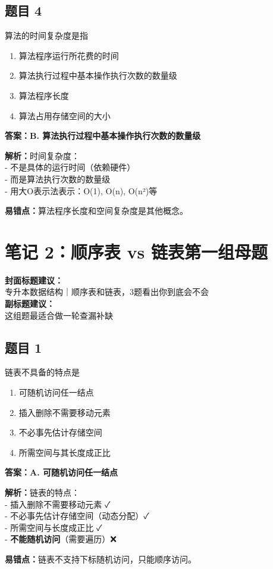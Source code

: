 \documentclass[12pt,a4paper]{ctexart}
\begin{document}
\subsection*{题目 4}
算法的时间复杂度是指
\begin{enumerate}[label=\Alph*.]
	\item 算法程序运行所花费的时间
	\item 算法执行过程中基本操作执行次数的数量级
	\item 算法程序长度
	\item 算法占用存储空间的大小
\end{enumerate}

\begin{answerbox}
	\textbf{答案：B. 算法执行过程中基本操作执行次数的数量级}

	\textbf{解析：}时间复杂度：\\
	- 不是具体的运行时间（依赖硬件）\\
	- 而是算法执行次数的数量级\\
	- 用大O表示法表示：O(1), O(n), O(n²)等

	\textbf{易错点：}算法程序长度和空间复杂度是其他概念。
\end{answerbox}

\newpage

\section{笔记 2：顺序表 vs 链表第一组母题}
\begin{coverbox}
	\textbf{封面标题建议：}\\
	专升本数据结构｜顺序表和链表，3题看出你到底会不会\\
	\textbf{副标题建议：}\\
	这组题最适合做一轮查漏补缺
\end{coverbox}

\subsection*{题目 1}
链表不具备的特点是
\begin{enumerate}[label=\Alph*.]
	\item 可随机访问任一结点
	\item 插入删除不需要移动元素
	\item 不必事先估计存储空间
	\item 所需空间与其长度成正比
\end{enumerate}

\begin{answerbox}
	\textbf{答案：A. 可随机访问任一结点}

	\textbf{解析：}链表的特点：\\
	- 插入删除不需要移动元素 ✓\\
	- 不必事先估计存储空间（动态分配）✓\\
	- 所需空间与长度成正比 ✓\\
	- \textbf{不能随机访问}（需要遍历）❌

	\textbf{易错点：}链表不支持下标随机访问，只能顺序访问。
\end{answerbox}
\end{document}
